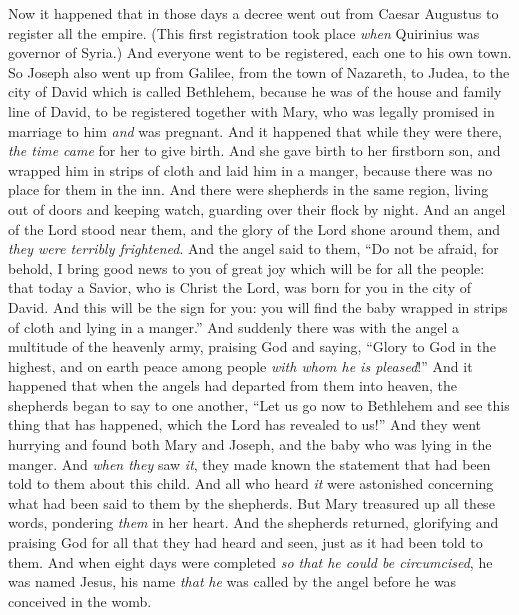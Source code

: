\begin{biblechapter} %
 Now it happened that in those days a decree went out from Caesar Augustus to register all the empire.
\verse (This first registration took place \textit{when} Quirinius was governor of Syria.)
\verse And everyone went to be registered, each one to his own town.
\verse So Joseph also went up from Galilee, from the town of Nazareth, to Judea, to the city of David which is called Bethlehem, because he was of the house and family line of David,
\verse to be registered together with Mary, who was legally promised in marriage to him \textit{and} was pregnant.
\verse And it happened that while they were there, \textit{the time came} for her to give birth.
\verse And she gave birth to her firstborn son, and wrapped him in strips of cloth and laid him in a manger, because there was no place for them in the inn.
 And there were shepherds in the same region, living out of doors and keeping watch, guarding over their flock by night.
\verse And an angel of the Lord stood near them, and the glory of the Lord shone around them, and \textit{they were terribly frightened}.
\verse And the angel said to them, “Do not be afraid, for behold, I bring good news to you of great joy which will be for all the people:
\verse that today a Savior, who is Christ the Lord, was born for you in the city of David.
\verse And this will be the sign for you: you will find the baby wrapped in strips of cloth and lying in a manger.”
\verse And suddenly there was with the angel a multitude of the heavenly army, praising God and saying,
\verse “Glory to God in the highest, 
and on earth peace 
among people \textit{with whom he is pleased}!”
\verse And it happened that when the angels had departed from them into heaven, the shepherds began to say to one another, “Let us go now to Bethlehem and see this thing that has happened, which the Lord has revealed to us!”
\verse And they went hurrying and found both Mary and Joseph, and the baby who was lying in the manger.
\verse And \textit{when they} saw \textit{it}, they made known the statement that had been told to them about this child.
\verse And all who heard \textit{it} were astonished concerning what had been said to them by the shepherds.
\verse But Mary treasured up all these words, pondering \textit{them} in her heart.
\verse And the shepherds returned, glorifying and praising God for all that they had heard and seen, just as it had been told to them.
\verse And when eight days were completed \textit{so that he could be circumcised}, he was named Jesus, his name \textit{that} \textit{he} was called by the angel before he was conceived in the womb.

\end{biblechapter}
